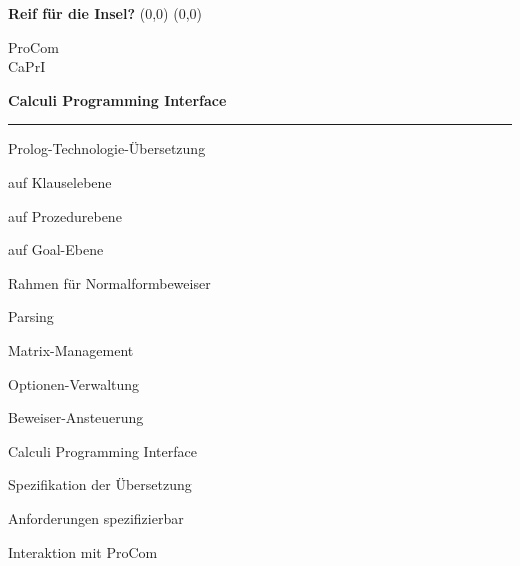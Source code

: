 \begin{Slide}
  {\bf Reif f\"ur die Insel?}
  \AD\AD
  \makebox(0,0){\unitlength=1mm}
  \makebox(0,0){%
    \begin{minipage}{.4\textwidth}
      \begin{center}
	{\bfLO ProCom\\[1.2ex]CaPrI}    
      \end{center}
    \end{minipage}}
  \AD\AD
  {\Large\bf Calculi Programming Interface}
  \rule{\textwidth}{2pt}
  
  \vspace{-100pt}
  \CAPRI\hfill\CAPRI

\end{Slide}
\begin{Slide}
  \large\bf

  \SPACE
  Prolog-Technologie-\"Ubersetzung
  \SPACE
  \begin{Itemize}[.6\textwidth]
    \item auf Klauselebene
    \item auf Prozedurebene
    \item auf Goal-Ebene
  \end{Itemize}

  \SPACE
\end{Slide}
\begin{Slide}
  \large\bf

  \SPACE
  Rahmen f\"ur Normalformbeweiser
  \SPACE
  \begin{Itemize}[.7\textwidth]
    \item Parsing
    \item Matrix-Management
    \item Optionen-Verwaltung
    \item Beweiser-Ansteuerung
  \end{Itemize}

  \SPACE
\end{Slide}
\begin{Slide}
  \large\bf

  \SPACE
  Calculi Programming Interface
  \SPACE
  \begin{Itemize}[.6\textwidth]
    \item Spezifikation der \"Ubersetzung
    \item Anforderungen spezifizierbar
    \item Interaktion mit ProCom
  \end{Itemize}

  \SPACE
\end{Slide}
